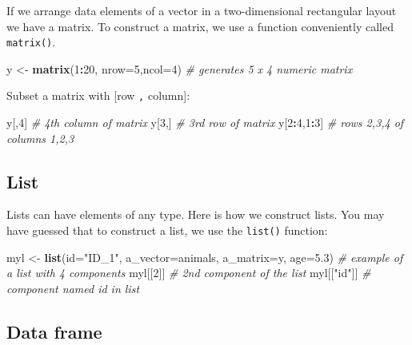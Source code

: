 \documentclass[]{book}
\newenvironment{Shaded}{\begin{snugshade}}{\end{snugshade}}
\newcommand{\KeywordTok}[1]{\textcolor[rgb]{0.13,0.29,0.53}{\textbf{#1}}}
\newcommand{\DataTypeTok}[1]{\textcolor[rgb]{0.13,0.29,0.53}{#1}}
\newcommand{\DecValTok}[1]{\textcolor[rgb]{0.00,0.00,0.81}{#1}}
\newcommand{\FloatTok}[1]{\textcolor[rgb]{0.00,0.00,0.81}{#1}}
\newcommand{\StringTok}[1]{\textcolor[rgb]{0.31,0.60,0.02}{#1}}
\newcommand{\CommentTok}[1]{\textcolor[rgb]{0.56,0.35,0.01}{\textit{#1}}}
\newcommand{\OperatorTok}[1]{\textcolor[rgb]{0.81,0.36,0.00}{\textbf{#1}}}
\newcommand{\NormalTok}[1]{#1}
\theoremstyle{definition}
\theoremstyle{definition}
\theoremstyle{definition}
\theoremstyle{remark}
\begin{document}
If we arrange data elements of a vector in a two-dimensional rectangular
layout we have a matrix. To construct a matrix, we use a function
conveniently called \texttt{matrix()}.

\begin{Shaded}
\begin{Highlighting}[]
\NormalTok{y <-}\StringTok{ }\KeywordTok{matrix}\NormalTok{(}\DecValTok{1}\OperatorTok{:}\DecValTok{20}\NormalTok{, }\DataTypeTok{nrow=}\DecValTok{5}\NormalTok{,}\DataTypeTok{ncol=}\DecValTok{4}\NormalTok{) }\CommentTok{# generates 5 x 4 numeric matrix}
\end{Highlighting}
\end{Shaded}

Subset a matrix with {[}row \texttt{,} column{]}:

\begin{Shaded}
\begin{Highlighting}[]
\NormalTok{y[,}\DecValTok{4}\NormalTok{]       }\CommentTok{# 4th column of matrix}
\NormalTok{y[}\DecValTok{3}\NormalTok{,]       }\CommentTok{# 3rd row of matrix}
\NormalTok{y[}\DecValTok{2}\OperatorTok{:}\DecValTok{4}\NormalTok{,}\DecValTok{1}\OperatorTok{:}\DecValTok{3}\NormalTok{]  }\CommentTok{# rows 2,3,4 of columns 1,2,3}
\end{Highlighting}
\end{Shaded}

\subsection{List}\label{list}

Lists can have elements of any type. Here is how we construct lists. You
may have guessed that to construct a list, we use the \texttt{list()}
function:

\begin{Shaded}
\begin{Highlighting}[]
\NormalTok{myl <-}\StringTok{ }\KeywordTok{list}\NormalTok{(}\DataTypeTok{id=}\StringTok{"ID_1"}\NormalTok{, }\DataTypeTok{a_vector=}\NormalTok{animals, }\DataTypeTok{a_matrix=}\NormalTok{y, }\DataTypeTok{age=}\FloatTok{5.3}\NormalTok{) }\CommentTok{# example of a list with 4 components}
\NormalTok{myl[[}\DecValTok{2}\NormalTok{]] }\CommentTok{# 2nd component of the list}
\NormalTok{myl[[}\StringTok{"id"}\NormalTok{]] }\CommentTok{# component named id in list}
\end{Highlighting}
\end{Shaded}

\subsection{Data frame}\label{data-frame}
\end{document}
